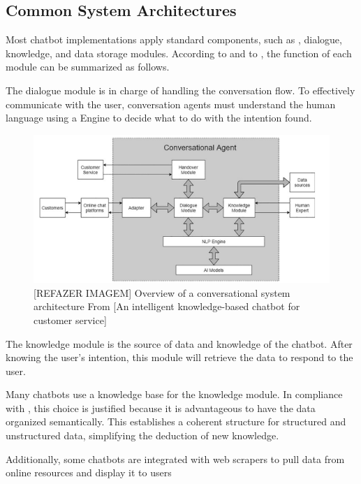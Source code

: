 \subsection{Common System Architectures}

Most chatbot implementations apply standard components, such as {\nlp}, dialogue, knowledge, and data storage modules.
According to \citet{ngai_intelligent_2021} and to \citet{dilmegani_cem_how_nodate}, the function of each module can be summarized as follows.

The dialogue module is in charge of handling the conversation flow. To effectively communicate with the user, conversation agents must understand the human language using a {\nlp} Engine to decide what to do with the intention found. 

\begin{figure}[ht]
    \includegraphics[width=14cm]{figs/chapter2/chatbot_architecture.png}
    \centering
    \caption{[REFAZER IMAGEM] Overview of a conversational system architecture From [An intelligent knowledge-based chatbot for customer service]}
\end{figure}

The knowledge module is the source of data and knowledge of the chatbot. After knowing the user's intention, this module will retrieve the data to respond to the user.

Many chatbots use a knowledge base for the knowledge module. In compliance with \citet{pereira_querying_2023}, this choice is justified because it is advantageous to have the data organized semantically. This establishes a coherent structure for structured and unstructured data, simplifying the deduction of new knowledge.

Additionally, some chatbots are integrated with web scrapers to pull data from online resources and display it to users


